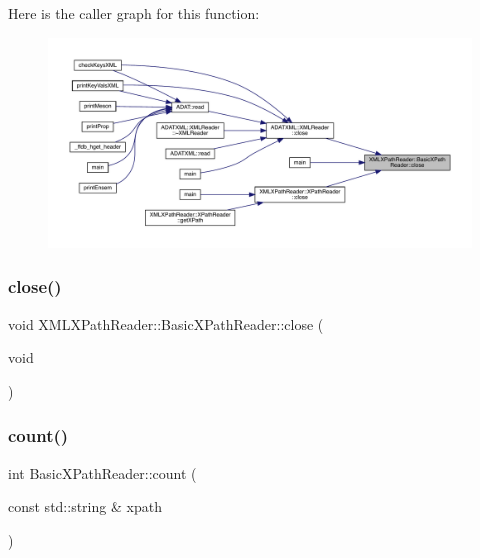 Here is the caller graph for this function\+:
\nopagebreak
\begin{figure}[H]
\begin{center}
\leavevmode
\includegraphics[width=350pt]{d6/dbf/classXMLXPathReader_1_1BasicXPathReader_acd03bd5e585de0a5077544314cd8fb9a_icgraph}
\end{center}
\end{figure}
\mbox{\label{classXMLXPathReader_1_1BasicXPathReader_acab41ee6353e8d7289d9c28828f9ceb6}} 
\subsubsection{\texorpdfstring{close()}{close()}\hspace{0.1cm}{\footnotesize\ttfamily [2/2]}}
{\footnotesize\ttfamily void X\+M\+L\+X\+Path\+Reader\+::\+Basic\+X\+Path\+Reader\+::close (\begin{DoxyParamCaption}\item[{void}]{ }\end{DoxyParamCaption})}

\mbox{\label{classXMLXPathReader_1_1BasicXPathReader_a2f1d474c6ff8160f210295f0d3671204}} 
\subsubsection{\texorpdfstring{count()}{count()}\hspace{0.1cm}{\footnotesize\ttfamily [1/2]}}
{\footnotesize\ttfamily int Basic\+X\+Path\+Reader\+::count (\begin{DoxyParamCaption}\item[{const std\+::string \&}]{xpath }\end{DoxyParamCaption})}

